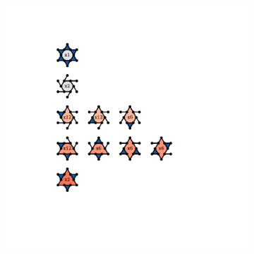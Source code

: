 \begin{figure}[bt]
\begin{subfigure}[b]{0.1\textwidth}
         \caption{}
         \label{fig:pro3pktrihex4}
     \end{subfigure}
     \hfill
     \begin{subfigure}[b]{0.1\textwidth}
         \centering
         \includegraphics[width=\textwidth]{./figures/procrystals/kagome7c.pdf}
         \caption{}
         \label{fig:pro3pktrihex5}
     \end{subfigure}
     \hfill
     \vspace{0.2cm}
     

\end{figure}
